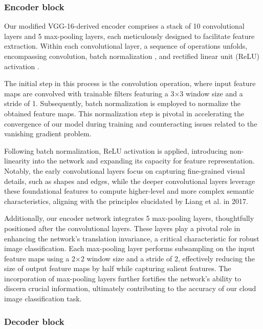 \documentclass[amt, article]{copernicus}
\begin{document}
\subsubsection{Encoder block}

Our modified VGG-16-derived encoder comprises a stack of 10 convolutional layers and 5 max-pooling layers, each meticulously designed to facilitate feature extraction. Within each convolutional layer, a sequence of operations unfolds, encompassing convolution, batch normalization \citep{ioffe2015batch, bjorck2018understanding}, and rectified linear unit (ReLU) activation \citep{agarap2018deep}.

The initial step in this process is the convolution operation, where input feature maps are convolved with trainable filters featuring a 3$\times$3 window size and a stride of 1. Subsequently, batch normalization is employed to normalize the obtained feature maps. This normalization step is pivotal in accelerating the convergence of our model during training and counteracting issues related to the vanishing gradient problem.

Following batch normalization, ReLU activation is applied, introducing non-linearity into the network and expanding its capacity for feature representation. Notably, the early convolutional layers focus on capturing fine-grained visual details, such as shapes and edges, while the deeper convolutional layers leverage these foundational features to compute higher-level and more complex semantic characteristics, aligning with the principles elucidated by Liang et al. in 2017.

Additionally, our encoder network integrates 5 max-pooling layers, thoughtfully positioned after the convolutional layers. These layers play a pivotal role in enhancing the network's translation invariance, a critical characteristic for robust image classification. Each max-pooling layer performs subsampling on the input feature maps using a 2$\times$2 window size and a stride of 2, effectively reducing the size of output feature maps by half while capturing salient features. The incorporation of max-pooling layers further fortifies the network's ability to discern crucial information, ultimately contributing to the accuracy of our cloud image classification task.

\subsubsection{Decoder block}
\end{document}
